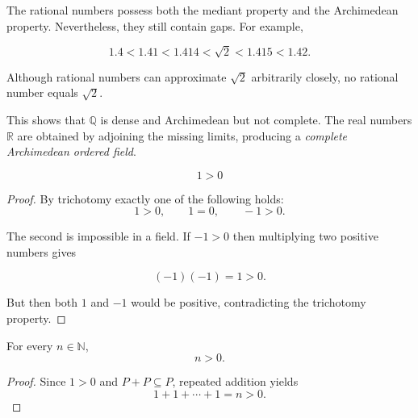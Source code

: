 
\begin{remark}

The rational numbers possess both the mediant property and the
Archimedean property.  Nevertheless, they still contain gaps.  For
example,

\[
1.4 < 1.41 < 1.414 < \sqrt{2} < 1.415 < 1.42.
\]

Although rational numbers can approximate $\sqrt{2}$ arbitrarily
closely, no rational number equals $\sqrt{2}$.

This shows that $\mathbb{Q}$ is dense and Archimedean but not
complete.  The real numbers $\mathbb{R}$ are obtained by adjoining
the missing limits, producing a \emph{complete Archimedean ordered
field}.

\end{remark}

\begin{theorem}
\[
1>0
\]
\end{theorem}

\begin{proof}
By trichotomy exactly one of the following holds:
\[
1>0, \qquad 1=0, \qquad -1>0.
\]

The second is impossible in a field.  
If $-1>0$ then multiplying two positive numbers gives

\[
(-1)(-1)=1>0.
\]

But then both $1$ and $-1$ would be positive, contradicting the
trichotomy property.
\end{proof}

\begin{corollary}
For every $n\in\mathbb{N}$,
\[
n>0.
\]
\end{corollary}

\begin{proof}
Since $1>0$ and $P+P\subseteq P$, repeated addition yields
\[
1+1+\cdots+1=n>0.
\]
\end{proof}




















